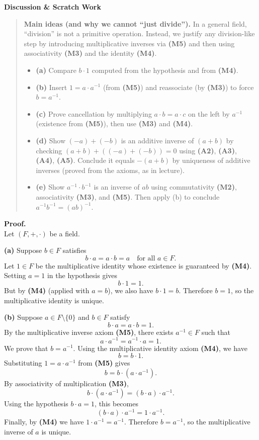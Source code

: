 \documentclass[12pt]{article}
\newenvironment{scratch}{%
  \par\smallskip
  \noindent\textbf{Discussion \& Scratch Work}\begin{quote}\small
}{%
  \end{quote}\smallskip
}
\begin{document}
\begin{scratch}
\textbf{Main ideas (and why we cannot “just divide”).}
In a general field, “division” is not a primitive operation. Instead, we justify any division-like step
by introducing multiplicative inverses via \textbf{(M5)} and then using associativity \textbf{(M3)} and the identity \textbf{(M4)}.

\begin{itemize}
\item \textbf{(a)} Compare $b\cdot 1$ computed from the hypothesis and from \textbf{(M4)}.
\item \textbf{(b)} Insert $1=a\cdot a^{-1}$ (from \textbf{(M5)}) and reassociate (by \textbf{(M3)}) to force $b=a^{-1}$.
\item \textbf{(c)} Prove cancellation by multiplying $a\cdot b=a\cdot c$ on the left by $a^{-1}$ (existence from \textbf{(M5)}), then use \textbf{(M3)} and \textbf{(M4)}.
\item \textbf{(d)} Show $(-a)+(-b)$ is an additive inverse of $(a+b)$ by checking $(a+b)+((-a)+(-b))=0$ using \textbf{(A2)}, \textbf{(A3)}, \textbf{(A4)}, \textbf{(A5)}. Conclude it equals $-(a+b)$ by uniqueness of additive inverses (proved from the axioms, as in lecture).
\item \textbf{(e)} Show $a^{-1}\cdot b^{-1}$ is an inverse of $ab$ using commutativity \textbf{(M2)}, associativity \textbf{(M3)}, and \textbf{(M5)}. Then apply (b) to conclude $a^{-1}b^{-1}=(ab)^{-1}$.
\end{itemize}
\end{scratch}

\textbf{Proof.}\\
Let $(F,+,\cdot)$ be a field.

\medskip
\textbf{(a)} Suppose $b\in F$ satisfies
\[
b\cdot a = a\cdot b = a \quad \text{for all } a\in F.
\]
Let $1\in F$ be the multiplicative identity whose existence is guaranteed by \textbf{(M4)}.
Setting $a=1$ in the hypothesis gives
\[
b\cdot 1 = 1.
\]
But by \textbf{(M4)} (applied with $a=b$), we also have $b\cdot 1=b$. Therefore $b=1$, so the
multiplicative identity is unique.

\medskip
\textbf{(b)} Suppose $a\in F\setminus\{0\}$ and $b\in F$ satisfy
\[
b\cdot a = a\cdot b = 1.
\]
By the multiplicative inverse axiom \textbf{(M5)}, there exists $a^{-1}\in F$ such that
\[
a\cdot a^{-1} = a^{-1}\cdot a = 1.
\]
We prove that $b=a^{-1}$. Using the multiplicative identity axiom \textbf{(M4)}, we have
\[
b = b\cdot 1.
\]
Substituting $1=a\cdot a^{-1}$ from \textbf{(M5)} gives
\[
b = b\cdot (a\cdot a^{-1}).
\]
By associativity of multiplication \textbf{(M3)},
\[
b\cdot (a\cdot a^{-1}) = (b\cdot a)\cdot a^{-1}.
\]
Using the hypothesis $b\cdot a=1$, this becomes
\[
(b\cdot a)\cdot a^{-1} = 1\cdot a^{-1}.
\]
Finally, by \textbf{(M4)} we have $1\cdot a^{-1}=a^{-1}$. Therefore $b=a^{-1}$, so the
multiplicative inverse of $a$ is unique.
\end{document}

